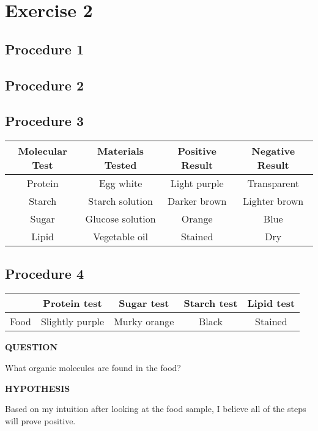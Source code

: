 \documentclass{article}
\begin{document}
\newcommand{\hr}{\par\noindent\rule{\textwidth}{0.4pt}}

\section{Exercise 2}

\subsection{Procedure 1}

\subsection{Procedure 2}

\subsection{Procedure 3}

\begin{tabular}{ | c | c | c | c | }
    \textbf{Molecular Test} & \textbf{Materials Tested} & \textbf{Positive Result} & \textbf{Negative Result} \\
    \hline
    Protein & Egg white & Light purple & Transparent \\
    Starch & Starch solution & Darker brown & Lighter brown \\
    Sugar & Glucose solution & Orange & Blue \\
    Lipid & Vegetable oil & Stained & Dry
\end{tabular}

\subsection{Procedure 4}

\begin{tabular}{ | c | c | c | c | c | }
    & \textbf{Protein test} & \textbf{Sugar test} & \textbf{Starch test} & \textbf{Lipid test} \\
    \hline
    Food & Slightly purple & Murky orange & Black & Stained
\end{tabular}

\textbf{QUESTION}

What organic molecules are found in the food?

\textbf{HYPOTHESIS}

Based on my intuition after looking at the food sample, I believe all of the steps will prove positive.
\end{document}
